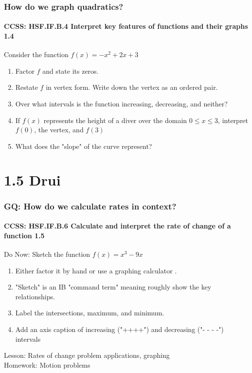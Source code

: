 \documentclass{beamer}
\begin{document}
  \frame
  {
    \frametitle{How do we graph quadratics?}
    \framesubtitle{CCSS: HSF.IF.B.4 Interpret key features of functions and their graphs \qquad \alert{1.4}}

    \begin{block}{Consider the function $f(x)=-x^2+2x+3$}
    \begin{enumerate}
        \item Factor $f$ and state its zeros.
        \item Restate $f$ in vertex form. Write down the vertex as an ordered pair.
        \item Over what intervals is the function increasing, decreasing, and neither?
        \item If $f(x)$ represents the height of a diver over the domain $0 \leq x \leq 3$, interpret $f(0)$, the vertex, and $f(3)$
        \item What does the "slope" of the curve represent?
    \end{enumerate}
    \end{block}
  }


  \section{1.5 Drui}
  \frame
  {
    \frametitle{GQ: How do we calculate rates in context?}
    \framesubtitle{CCSS: HSF.IF.B.6 Calculate and interpret the rate of change of a function \qquad \alert{1.5}}

    \begin{block}{Do Now: Sketch the function $f(x)=x^3-9x$}
      \begin{enumerate}
      \item Either factor it by hand or use a graphing calculator .
      \item "Sketch" is an IB "command term" meaning roughly show the key relationships.
      \item Label the intersections, maximum, and minimum.
      \item Add an axis caption of increasing ("++++") and decreasing ("- - - -") intervals
      \end{enumerate}
   \end{block}
    Lesson: Rates of change problem applications, graphing\\%
    Homework: Motion problems
  }

  
\end{document}
